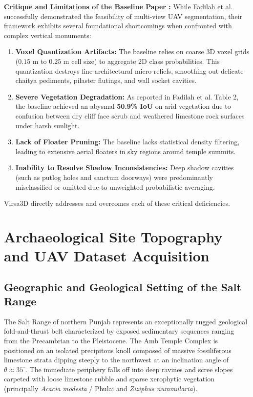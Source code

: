\documentclass[11pt,a4paper]{article}
\begin{document}
\textbf{Critique and Limitations of the Baseline Paper \cite{fadilah2024multiview}:}
While Fadilah et al. successfully demonstrated the feasibility of multi-view UAV segmentation, their framework exhibits several foundational shortcomings when confronted with complex vertical monuments:
\begin{enumerate}
    \item \textbf{Voxel Quantization Artifacts:} The baseline relies on coarse 3D voxel grids ($0.15\text{ m}$ to $0.25\text{ m}$ cell size) to aggregate 2D class probabilities. This quantization destroys fine architectural micro-reliefs, smoothing out delicate chaitya pediments, pilaster flutings, and wall socket cavities.
    \item \textbf{Severe Vegetation Degradation:} As reported in Fadilah et al. Table 2, the baseline achieved an abysmal \textbf{50.9\% IoU} on arid vegetation due to confusion between dry cliff face scrub and weathered limestone rock surfaces under harsh sunlight.
    \item \textbf{Lack of Floater Pruning:} The baseline lacks statistical density filtering, leading to extensive aerial floaters in sky regions around temple summits.
    \item \textbf{Inability to Resolve Shadow Inconsistencies:} Deep shadow cavities (such as putlog holes and sanctum doorways) were predominantly misclassified or omitted due to unweighted probabilistic averaging.
\end{enumerate}
Virsa3D directly addresses and overcomes each of these critical deficiencies.
\section{Archaeological Site Topography and UAV Dataset Acquisition}
\label{sec:dataset}

\subsection{Geographic and Geological Setting of the Salt Range}
The Salt Range of northern Punjab represents an exceptionally rugged geological fold-and-thrust belt characterized by exposed sedimentary sequences ranging from the Precambrian to the Pleistocene. The Amb Temple Complex is positioned on an isolated precipitous knoll composed of massive fossiliferous limestone strata dipping steeply to the northwest at an inclination angle of $\theta \approx 35^\circ$. The immediate periphery falls off into deep ravines and scree slopes carpeted with loose limestone rubble and sparse xerophytic vegetation (principally \textit{Acacia modesta} / Phulai and \textit{Ziziphus nummularia}).
\end{document}
